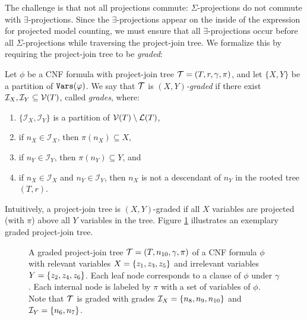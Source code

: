 The challenge is that not all projections commute: $\Sigma$-projections do not commute with $\exists$-projections. Since the $\exists$-projections appear on the inside of the expression for projected model counting, we must ensure that all $\exists$-projections occur before all $\Sigma$-projections while traversing the project-join tree. We formalize this by requiring the project-join tree to be \emph{graded}:
\begin{definition}
\label{def:graded}
    Let $\phi$ be a CNF formula with project-join tree $\mathcal{T} = (T, r, \gamma, \pi)$, and let $\{X, Y\}$ be a partition of $\texttt{\upshape Vars}(\varphi)$.
    We say that $\mathcal{T}$ is \emph{$(X,Y)$-graded} if there exist $\mathcal{I}_X, \mathcal{I}_Y \subseteq \mathcal{V}(T)$, called \emph{grades}, where:
    \begin{enumerate}
        \item $\{\mathcal{I}_X, \mathcal{I}_Y\}$ is a partition of $\mathcal{V}(T) \setminus \mathcal{L}(T)$,
        \item if $n_X \in \mathcal{I}_X$, then $\pi(n_X) \subseteq X$,
        \item if $n_Y \in \mathcal{I}_Y$, then $\pi(n_Y) \subseteq Y$, and
        \item if $n_X \in \mathcal{I}_X$ and $n_Y \in \mathcal{I}_Y$, then $n_X$ is not a descendant of $n_Y$ in the rooted tree $(T, r)$.
    \end{enumerate}
\end{definition}

Intuitively, a project-join tree is $(X,Y)$-graded if all $X$ variables are projected (with $\pi$) above all $Y$ variables in the tree. Figure \ref{tree_ex} illustrates an exemplary graded project-join tree.
\begin{figure}[t]
    \centering
    \caption{
        A graded project-join tree $\mathcal{T} = (T, n_{10}, \gamma, \pi)$ of a CNF formula $\phi$ with relevant variables $X = \left\{ z_1, z_3, z_5 \right\}$ and irrelevant variables $Y = \left\{ z_2, z_4, z_6 \right\}$.
        Each leaf node corresponds to a clause of $\phi$ under $\gamma$.
        Each internal node is labeled by $\pi$ with a set of variables of $\phi$.
        Note that $\mathcal{T}$ is graded with grades $\mathcal{I}_X = \left\{ n_8, n_9, n_{10} \right\}$ and $\mathcal{I}_Y = \left\{ n_6, n_7 \right\}$.
    }
    \label{tree_ex}
\end{figure}

